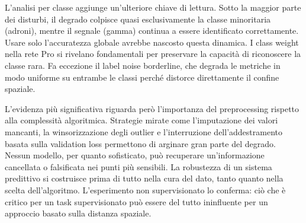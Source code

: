 \documentclass[12pt,a4paper]{article}
\begin{document}
L'analisi per classe aggiunge un'ulteriore chiave di lettura. Sotto la maggior parte dei disturbi, il degrado colpisce quasi esclusivamente la classe minoritaria (adroni), mentre il segnale (gamma) continua a essere identificato correttamente. Usare solo l'accuratezza globale avrebbe nascosto questa dinamica. I class weight nella rete Pro si rivelano fondamentali per preservare la capacità di riconoscere la classe rara. Fa eccezione il label noise borderline, che degrada le metriche in modo uniforme su entrambe le classi perché distorce direttamente il confine spaziale.

L'evidenza più significativa riguarda però l'importanza del preprocessing rispetto alla complessità algoritmica. Strategie mirate come l'imputazione dei valori mancanti, la winsorizzazione degli outlier e l'interruzione dell'addestramento basata sulla validation loss permettono di arginare gran parte del degrado. Nessun modello, per quanto sofisticato, può recuperare un'informazione cancellata o falsificata nei punti più sensibili. La robustezza di un sistema predittivo si costruisce prima di tutto nella cura del dato, tanto quanto nella scelta dell'algoritmo. L'esperimento non supervisionato lo conferma: ciò che è critico per un task supervisionato può essere del tutto ininfluente per un approccio basato sulla distanza spaziale.
\end{document}
